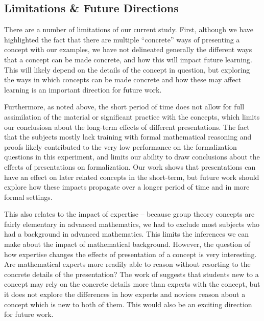 \documentclass[man,10pt]{apa6}
\begin{document}
\subsection{Limitations \& Future Directions}
There are a number of limitations of our current study. First, although we have highlighted the fact that there are multiple ``concrete'' ways of presenting a concept with our examples, we have not delineated generally the different ways that a concept can be made concrete, and how this will impact future learning. This will likely depend on the details of the concept in question, but exploring the ways in which concepts can be made concrete and how these may affect learning is an important direction for future work.\par
Furthermore, as noted above, the short period of time does not allow for full assimilation of the material or significant practice with the concepts, which limits our conclusiosn about the long-term effects of different presentations. The fact that the subjects mostly lack training with formal mathematical reasoning and proofs likely contributed to the very low performance on the formalization questions in this experiment, and limits our ability to draw conclusions about the effects of presentations on formalization. Our work shows that presentations can have an effect on later related concepts in the short-term, but future work should explore how these impacts propagate over a longer period of time and in more formal settings. \par
This also relates to the impact of expertise -- because group theory concepts are fairly elementary in advanced mathematics, we had to exclude most subjects who had a background in advanced mathematics. This limits the inferences we can make about the impact of mathematical background. However, the question of how expertise changes the effects of presentation of a concept is very interesting. Are mathematical experts more readily able to reason without resorting to the concrete details of the presentation? The work of  suggests that students new to a concept may rely on the concrete details more than experts with the concept, but it does not explore the differences in how experts and novices reason about a concept which is new to both of them. This would also be an exciting direction for future work.\par
\end{document}
